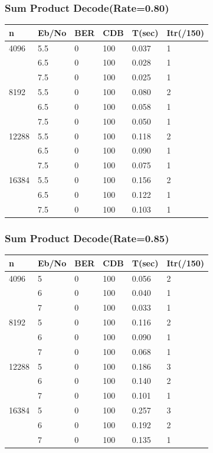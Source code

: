 \documentclass[xcolor=dvipsname]
{beamer}
\begin{document}
\begin{frame}[t] 
\frametitle{Sum Product Decode(Rate=0.80)}
\begin{table}[]
\centering
\begin{tabular}{|l|l|l|l|l|l|}
\hline
n     & Eb/No & BER & CDB & T(sec)& Itr(/150) \\ \hline
4096  & 5.5   & 0   & 100 & 0.037 & 1   \\ 
      & 6.5   & 0   & 100 & 0.028 & 1   \\ 
      & 7.5   & 0   & 100 & 0.025 & 1   \\ \hline
8192  & 5.5   & 0   & 100 & 0.080 & 2   \\ 
      & 6.5   & 0   & 100 & 0.058 & 1   \\ 
      & 7.5   & 0   & 100 & 0.050 & 1   \\ \hline
12288 & 5.5   & 0   & 100 & 0.118 & 2   \\ 
      & 6.5   & 0   & 100 & 0.090 & 1   \\ 
      & 7.5   & 0   & 100 & 0.075 & 1   \\ \hline
16384 & 5.5   & 0   & 100 & 0.156 & 2   \\ 
      & 6.5   & 0   & 100 & 0.122 & 1   \\ 
      & 7.5   & 0   & 100 & 0.103 & 1   \\ \hline
\end{tabular}
\end{table}

\end{frame}

\begin{frame}[t] 
\frametitle{Sum Product Decode(Rate=0.85)}
\begin{table}[]
\centering
\begin{tabular}{|l|l|l|l|l|l|}
\hline
n     & Eb/No & BER & CDB & T(sec) & Itr(/150) \\ \hline
4096  & 5     & 0   & 100 & 0.056  & 2         \\ 
      & 6     & 0   & 100 & 0.040  & 1         \\ 
      & 7     & 0   & 100 & 0.033  & 1         \\ \hline
8192  & 5     & 0   & 100 & 0.116  & 2         \\ 
      & 6     & 0   & 100 & 0.090  & 1         \\ 
      & 7     & 0   & 100 & 0.068  & 1         \\ \hline
12288 & 5     & 0   & 100 & 0.186  & 3         \\ 
      & 6     & 0   & 100 & 0.140  & 2         \\ 
      & 7     & 0   & 100 & 0.101  & 1         \\ \hline
16384 & 5     & 0   & 100 & 0.257  & 3         \\ 
      & 6     & 0   & 100 & 0.192  & 2         \\ 
      & 7     & 0   & 100 & 0.135  & 1         \\ \hline
\end{tabular}
\end{table}

\end{frame}
\end{document}
